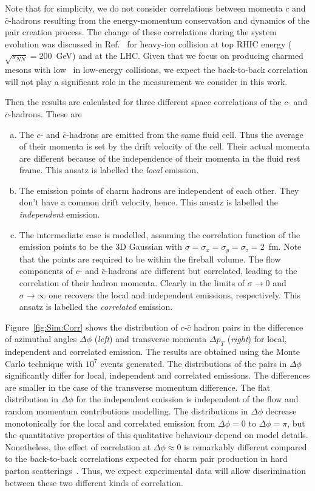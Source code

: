 \documentclass[floatfix,superscriptaddress,a4paper,
               showpieces,showkeys,nofootinbib,preprint]{revtex4-2}
\begin{document}
Note that for simplicity, we do not consider correlations between momenta $c$ and $\bar{c}$-hadrons resulting from the energy-momentum conservation and dynamics of the pair creation process. The change of these correlations during the system evolution was discussed in Ref.~\cite{Zhu:2006er,Cao:2015cba} for heavy-ion collision at top RHIC energy ($\sqrt{s_{NN}} = 200$~GeV) and at the LHC. Given that we focus on producing charmed mesons with low \pt\ in low-energy collisions, we expect the back-to-back correlation will not play a significant role in the measurement we consider in this work.

Then the results are calculated for three different space correlations of the $c$- and $\bar{c}$-hadrons. These are
\begin{enumerate}[(a)]
\item
The $c$- and $\bar{c}$-hadrons are emitted from the same fluid cell.
Thus the average of their momenta is set by the  drift velocity of the cell. Their actual momenta are different because of the independence of their momenta in the fluid rest frame. This ansatz is labelled  the \textit{local} emission.
\item
The emission points of charm hadrons are independent of each other.
They don't have a common drift velocity, hence.
This ansatz is labelled the \textit{independent} emission.
\item
The intermediate case is modelled, assuming the correlation function of the emission points to be the 3D Gaussian with $\sigma = \sigma_x = \sigma_y = \sigma_z =2$~fm. 
Note that the points are required to be within the fireball volume. The flow components of $c$- and $\bar{c}$-hadrons are different but correlated, leading to the correlation of their hadron momenta.
Clearly in the limits of $\sigma \rightarrow 0$ and $\sigma \rightarrow \infty$ 
one recovers the local and independent emissions, respectively.
This ansatz is labelled the \textit{correlated} emission. 
\end{enumerate}

Figure~\ref{fig:Sim:Corr} shows the distribution of $c$-$\bar{c}$ hadron pairs 
in the difference of azimuthal angles $\Delta\phi$ (\textit{left}) and transverse momenta $\Delta p_T$ (\textit{right}) for local, independent and correlated emission.
The results are obtained using the Monte Carlo technique with $10^7$ events generated.
The distributions of the pairs in $\Delta \phi$ significantly differ for local, independent and correlated emissions. The differences are smaller in the case of the transverse momentum difference.
The flat distribution in $\Delta\phi$ for the independent emission  is independent of the flow and random momentum contributions modelling. The distributions in $\Delta\phi$ decrease monotonically for the local and correlated emission from $\Delta \phi = 0$ to $\Delta \phi = \pi$, but the quantitative properties of this qualitative behaviour depend on model details. Nonetheless, the effect of correlation at $\Delta \phi \approx 0$ is remarkably different compared to the back-to-back correlations expected for charm pair production in hard parton scatterings~\cite{Zhu:2006er,Cao:2015cba}. Thus, we expect experimental data will allow discrimination between these two different kinds of correlation. 
\end{document}
